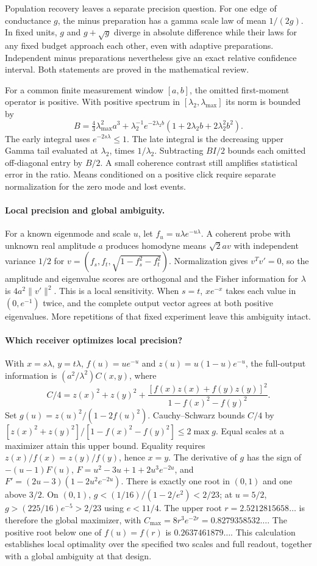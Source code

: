 \documentclass[11pt,letterpaper]{article}
\begin{document}
Population recovery leaves a separate precision question. For one edge of conductance $g$, the minus preparation has a gamma scale law of mean $1/(2g)$. In fixed units, $g$ and $g+\sqrt g$ diverge in absolute difference while their laws for any fixed budget approach each other, even with adaptive preparations. Independent minus preparations nevertheless give an exact relative confidence interval. Both statements are proved in the mathematical review.

For a common finite measurement window $[a,b]$, the omitted first-moment operator is positive. With positive spectrum in $[\lambda_2,\lambda_{\max}]$ its norm is bounded by
\[
 B=\tfrac43\lambda_{\max}^2a^3+
 \lambda_2^{-1}e^{-2\lambda_2 b}(1+2\lambda_2b+2\lambda_2^2 b^2).
\]
The early integral uses $e^{-2s\lambda}\le1$. The late integral is the decreasing upper Gamma tail evaluated at $\lambda_2$, times $1/\lambda_2$. Subtracting $BI/2$ bounds each omitted off-diagonal entry by $B/2$. A small coherence contrast still amplifies statistical error in the ratio. Means conditioned on a positive click require separate normalization for the zero mode and lost events.

\paragraph{Local precision and global ambiguity.}
For a known eigenmode and scale $u$, let $f_u=u\lambda e^{-u\lambda}$. A coherent probe with unknown real amplitude $a$ produces homodyne means $\sqrt2 a v$ with independent variance $1/2$ for $v=(f_s,f_t,\sqrt{1-f_s^2-f_t^2})$. Normalization gives $v^Tv'=0$, so the amplitude and eigenvalue scores are orthogonal and the Fisher information for $\lambda$ is $4a^2\|v'\|^2$. This is a local sensitivity. When $s=t$, $x e^{-x}$ takes each value in $(0,e^{-1})$ twice, and the complete output vector agrees at both positive eigenvalues. More repetitions of that fixed experiment leave this ambiguity intact.

\paragraph{Which receiver optimizes local precision?}
With $x=s\lambda$, $y=t\lambda$, $f(u)=u e^{-u}$ and $z(u)=u(1-u)e^{-u}$, the full-output information is $(a^2/\lambda^2)C(x,y)$, where
\[
 C/4=z(x)^2+z(y)^2+\frac{[f(x)z(x)+f(y)z(y)]^2}{1-f(x)^2-f(y)^2}.
\]
Set $g(u)=z(u)^2/(1-2f(u)^2)$. Cauchy–Schwarz bounds $C/4$ by $[z(x)^2+z(y)^2]/[1-f(x)^2-f(y)^2]\le2\max g$. Equal scales at a maximizer attain this upper bound. Equality requires $z(x)/f(x)=z(y)/f(y)$, hence $x=y$. The derivative of $g$ has the sign of $-(u-1)F(u)$, $F=u^2-3u+1+2u^3e^{-2u}$, and $F'=(2u-3)(1-2u^2 e^{-2u})$. There is exactly one root in $(0,1)$ and one above $3/2$. On $(0,1)$, $g<(1/16)/(1-2/e^2)<2/23$; at $u=5/2$, $g> (225/16)e^{-5}>2/23$ using $e<11/4$. The upper root $r=2.5212815658\ldots$ is therefore the global maximizer, with $C_{\max}=8r^3e^{-2r}=0.8279358532\ldots$. The positive root below one of $f(u)=f(r)$ is $0.2637461879\ldots$. This calculation establishes local optimality over the specified two scales and full readout, together with a global ambiguity at that design.
\end{document}
